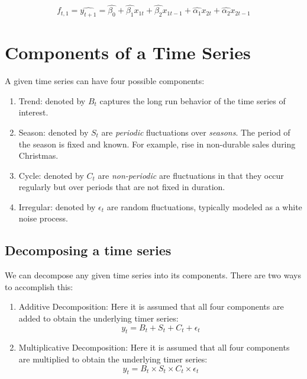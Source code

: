 \documentclass[]{book}
\theoremstyle{definition}
\theoremstyle{definition}
\theoremstyle{definition}
\theoremstyle{remark}
\begin{document}
\begin{equation}
f_{t,1}=\widehat{y_{t+1}}=\hat{\beta_0}+\hat{\beta_1}x_{1t} + \hat{\beta_2}x_{1t-1}+ \hat{\alpha_1}x_{2t}+\hat{\alpha_2}x_{2t-1}
\end{equation}

\hypertarget{components-of-a-time-series}{%
\chapter{Components of a Time
Series}\label{components-of-a-time-series}}

A given time series can have four possible components:

\begin{enumerate}
\def\labelenumi{\arabic{enumi}.}
\item
  Trend: denoted by \(B_t\) captures the long run behavior of the time
  series of interest.
\item
  Season: denoted by \(S_t\) are \emph{periodic} fluctuations over
  \emph{seasons}. The period of the season is fixed and known. For
  example, rise in non-durable sales during Christmas.
\item
  Cycle: denoted by \(C_t\) are \emph{non-periodic} are fluctuations in
  that they occur regularly but over periods that are not fixed in
  duration.
\item
  Irregular: denoted by \(\epsilon_t\) are random fluctuations,
  typically modeled as a white noise process.
\end{enumerate}

\hypertarget{decomposing-a-time-series}{%
\section{Decomposing a time series}\label{decomposing-a-time-series}}

We can decompose any given time series into its components. There are
two ways to accomplish this:

\begin{enumerate}
\def\labelenumi{\arabic{enumi}.}
\item
  Additive Decomposition: Here it is assumed that all four components
  are added to obtain the underlying timer series: \begin{equation}
  y_t= B_t+S_t+C_t +\epsilon_t
  \end{equation}
\item
  Multiplicative Decomposition: Here it is assumed that all four
  components are multiplied to obtain the underlying timer series:
  \begin{equation}
  y_t= B_t \times S_t \times C_t \times \epsilon_t
  \end{equation}
\end{enumerate}
\end{document}

